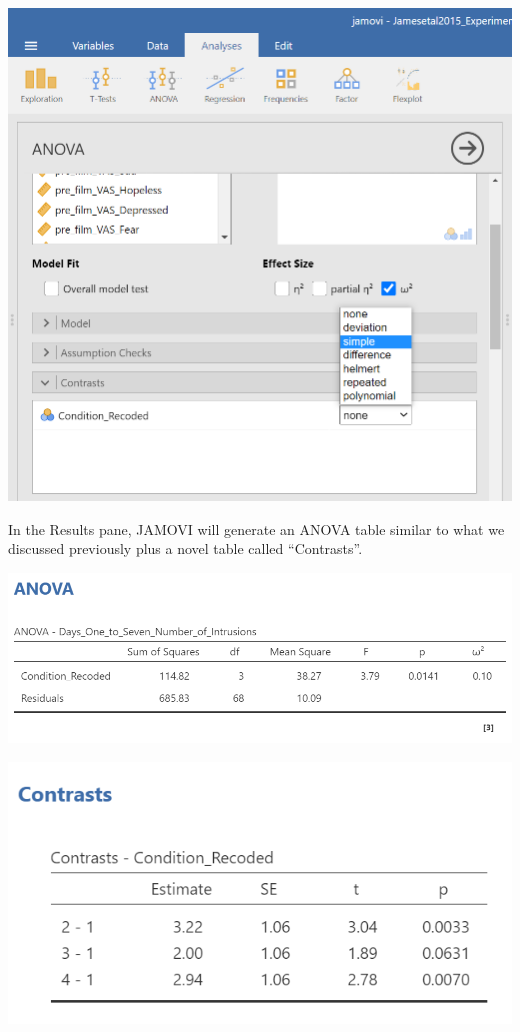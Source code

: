 \documentclass[
]{book}
\begin{document}
\includegraphics{img/ANOVACommandsWithPlannedContrast.png}

In the Results pane, JAMOVI will generate an ANOVA table similar to what we discussed previously plus a novel table called ``Contrasts''.

\includegraphics{img/ANOVAResultsANOVATable2.png}

\includegraphics{img/ANOVAPlannedContrastsResults.png}
\end{document}
